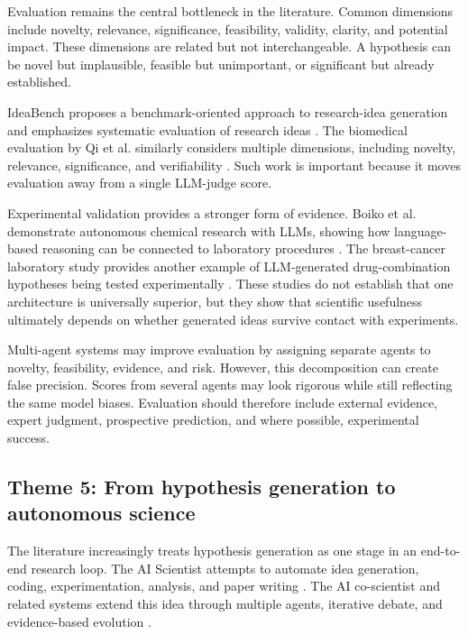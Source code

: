 \documentclass[11pt]{article}
\begin{document}
Evaluation remains the central bottleneck in the literature. Common dimensions include novelty,
relevance, significance, feasibility, validity, clarity, and potential impact. These dimensions are
related but not interchangeable. A hypothesis can be novel but implausible, feasible but
unimportant, or significant but already established.

IdeaBench proposes a benchmark-oriented approach to research-idea generation and emphasizes
systematic evaluation of research ideas \cite{guo2025ideabench}. The biomedical evaluation by Qi
et al. similarly considers multiple dimensions, including novelty, relevance, significance, and
verifiability \cite{qi2024biomedical}. Such work is important because it moves evaluation away
from a single LLM-judge score.

Experimental validation provides a stronger form of evidence. Boiko et al. demonstrate autonomous
chemical research with LLMs, showing how language-based reasoning can be connected to
laboratory procedures \cite{boiko2023autonomous}. The breast-cancer laboratory study provides
another example of LLM-generated drug-combination hypotheses being tested experimentally
\cite{scientific2025laboratory}. These studies do not establish that one architecture is universally
superior, but they show that scientific usefulness ultimately depends on whether generated ideas
survive contact with experiments.

Multi-agent systems may improve evaluation by assigning separate agents to novelty, feasibility,
evidence, and risk. However, this decomposition can create false precision. Scores from several
agents may look rigorous while still reflecting the same model biases. Evaluation should therefore
include external evidence, expert judgment, prospective prediction, and where possible,
experimental success.

\subsection{Theme 5: From hypothesis generation to autonomous science}
\label{subsec:autonomous-science}

The literature increasingly treats hypothesis generation as one stage in an end-to-end research loop.
The AI Scientist attempts to automate idea generation, coding, experimentation, analysis, and paper
writing \cite{lu2024ai}. The AI co-scientist and related systems extend this idea through multiple
agents, iterative debate, and evidence-based evolution \cite{gottweis2025towards}.
\end{document}
